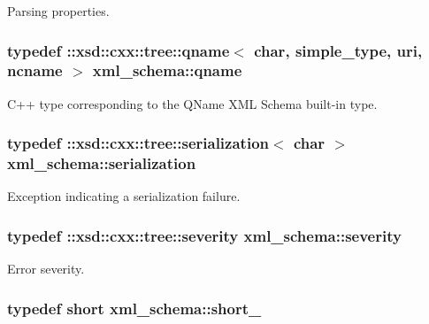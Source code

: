 Parsing properties. 

\hypertarget{namespacexml__schema_af47d5d85d1b1714be503513b1c09c079}{
\subsubsection[{qname}]{\setlength{\rightskip}{0pt plus 5cm}typedef \-::xsd\-::cxx\-::tree\-::qname$<$ char, {\bf simple\-\_\-type}, {\bf uri}, {\bf ncname} $>$ {\bf xml\-\_\-schema\-::qname}}}\label{namespacexml__schema_af47d5d85d1b1714be503513b1c09c079}


C++ type corresponding to the Q\-Name X\-M\-L Schema built-\/in type. 

\hypertarget{namespacexml__schema_a40e04a11c9e6204762591b4de3755899}{
\subsubsection[{serialization}]{\setlength{\rightskip}{0pt plus 5cm}typedef \-::xsd\-::cxx\-::tree\-::serialization$<$ char $>$ {\bf xml\-\_\-schema\-::serialization}}}\label{namespacexml__schema_a40e04a11c9e6204762591b4de3755899}


Exception indicating a serialization failure. 

\hypertarget{namespacexml__schema_aaac8e21420b35e58ad94533db40ccf41}{
\subsubsection[{severity}]{\setlength{\rightskip}{0pt plus 5cm}typedef \-::xsd\-::cxx\-::tree\-::severity {\bf xml\-\_\-schema\-::severity}}}\label{namespacexml__schema_aaac8e21420b35e58ad94533db40ccf41}


Error severity. 

\hypertarget{namespacexml__schema_a705720c1fed1575ccdcfd21cb7ab39ab}{
\subsubsection[{short\-\_\-}]{\setlength{\rightskip}{0pt plus 5cm}typedef short {\bf xml\-\_\-schema\-::short\-\_\-}}}\label{namespacexml__schema_a705720c1fed1575ccdcfd21cb7ab39ab}


